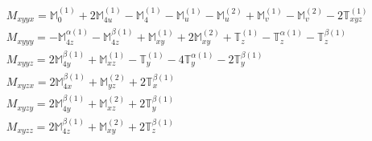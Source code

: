 \documentclass[fleqn,8pt,landscape]{jsarticle}
\begin{document}
\begin{align*}
& M_{xyyx} = \mathbb{M}_{0}^{(1)} + 2 \mathbb{M}_{4u}^{(1)} - \mathbb{M}_{4}^{(1)} - \mathbb{M}_{u}^{(1)} - \mathbb{M}_{u}^{(2)} + \mathbb{M}_{v}^{(1)} - \mathbb{M}_{v}^{(2)} - 2 \mathbb{T}_{xyz}^{(1)} \\
& M_{xyyy} = - \mathbb{M}_{4z}^{\alpha(1)} - \mathbb{M}_{4z}^{\beta(1)} + \mathbb{M}_{xy}^{(1)} + 2 \mathbb{M}_{xy}^{(2)} + \mathbb{T}_{z}^{(1)} - \mathbb{T}_{z}^{\alpha(1)} - \mathbb{T}_{z}^{\beta(1)} \\
& M_{xyyz} = 2 \mathbb{M}_{4y}^{\beta(1)} + \mathbb{M}_{xz}^{(1)} - \mathbb{T}_{y}^{(1)} - 4 \mathbb{T}_{y}^{\alpha(1)} - 2 \mathbb{T}_{y}^{\beta(1)} \\
& M_{xyzx} = 2 \mathbb{M}_{4x}^{\beta(1)} + \mathbb{M}_{yz}^{(2)} + 2 \mathbb{T}_{x}^{\beta(1)} \\
& M_{xyzy} = 2 \mathbb{M}_{4y}^{\beta(1)} + \mathbb{M}_{xz}^{(2)} + 2 \mathbb{T}_{y}^{\beta(1)} \\
& M_{xyzz} = 2 \mathbb{M}_{4z}^{\beta(1)} + \mathbb{M}_{xy}^{(2)} + 2 \mathbb{T}_{z}^{\beta(1)}
\end{align*}
\end{document}
